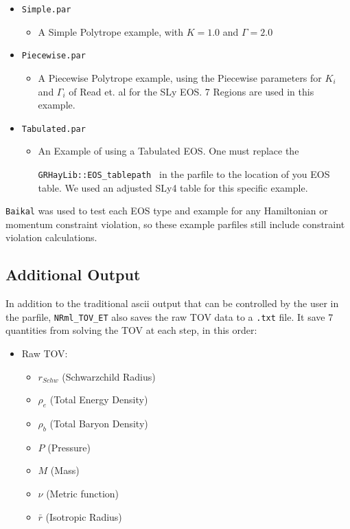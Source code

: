 \begin{itemize}
    \item {\tt Simple.par }
    \begin{itemize}
    \item A Simple Polytrope example, with $K=1.0$ and $\Gamma=2.0$
    \end{itemize}
    \item {\tt Piecewise.par }
    \begin{itemize}
    \item A Piecewise Polytrope example, using the Piecewise parameters for $K_i$ and $\Gamma_i$ of Read et. al for the SLy EOS.\cite{Read} 7 Regions are used in this example.
    \end{itemize}
    \item {\tt Tabulated.par }
    \begin{itemize}
    \item An Example of using a Tabulated EOS. One must replace the 
    
    {\tt GRHayLib::EOS\_tablepath } in the parfile to the location of you EOS table. We used an adjusted SLy4 table for this specific example.
    \end{itemize}
\end{itemize}

{\tt Baikal} was used to test each EOS type and example for any Hamiltonian or momentum constraint violation, so these example parfiles still include constraint violation calculations.

\subsection{Additional Output}

In addition to the traditional ascii output that can be controlled by the user in the parfile, {\tt NRml\_TOV\_ET} also saves the raw TOV data to a {\tt .txt} file. It save 7 quantities from solving the TOV at each step, in this order:
\begin{itemize}
    \item Raw TOV:
        \begin{itemize}
            \item $r_{Schw}$ (Schwarzchild Radius)
            \item $\rho_{e}$ (Total Energy Density)
            \item $\rho_{b}$ (Total Baryon Density)
            \item $P$ (Pressure)
            \item $M$ (Mass)
            \item $\nu$ (Metric function)
            \item $\bar{r}$ (Isotropic Radius)
        \end{itemize}
\end{itemize}

